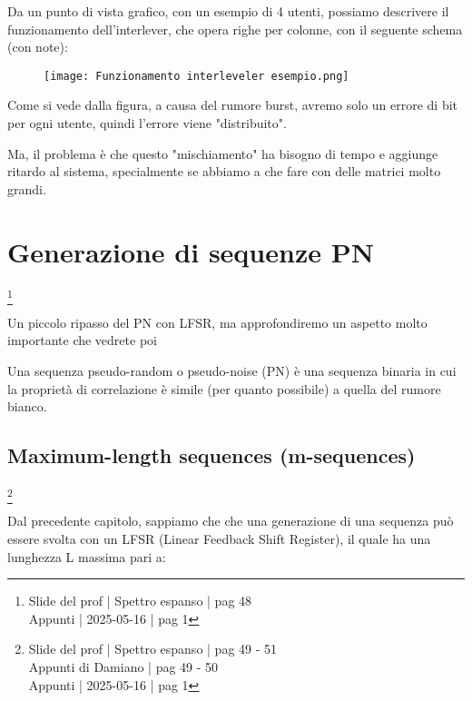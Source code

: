 Da un punto di vista grafico, con un esempio di 4 utenti, 
possiamo descrivere il funzionamento dell'interlever, che opera righe per colonne, 
con il seguente schema (con note): 

\begin{figure}[h]
    \centering
    \texttt{[image: Funzionamento interleveler esempio.png]}
\end{figure}

Come si vede dalla figura, 
a causa del rumore burst, 
avremo solo un errore di bit per ogni utente, 
quindi l'errore viene "distribuito". \newline 

Ma, il problema è che questo "mischiamento" ha bisogno di tempo e aggiunge ritardo al sistema, 
specialmente se abbiamo a che fare con delle matrici molto grandi. \newline 

\newpage 

\section{Generazione di sequenze PN}
\footnote{Slide del prof | Spettro espanso | pag 48 \\
Appunti | 2025-05-16 | pag 1 
} 

\begin{tcolorbox}
Un piccolo ripasso del PN con LFSR, 
ma approfondiremo un aspetto molto importante che vedrete poi    
\end{tcolorbox}

Una sequenza pseudo-random o pseudo-noise (PN) 
è una sequenza binaria in cui la proprietà di correlazione è simile 
(per quanto possibile) a quella del rumore bianco. \newline 

\newpage 

\subsection{Maximum-length sequences (m-sequences)}
\footnote{Slide del prof | Spettro espanso | pag 49 - 51\\
Appunti di Damiano | pag 49 - 50\\
Appunti | 2025-05-16 | pag 1 
} 

Dal precedente capitolo, 
sappiamo che che una generazione di una sequenza può essere svolta con un LFSR (Linear Feedback Shift Register), 
il quale ha una lunghezza L massima pari a: 

